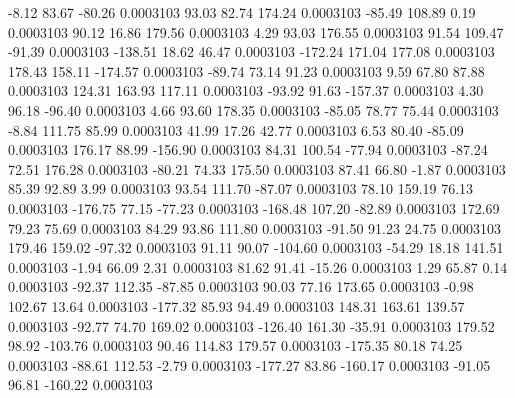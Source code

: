        -8.12       83.67      -80.26     0.0003103
       93.03       82.74      174.24     0.0003103
      -85.49      108.89        0.19     0.0003103
       90.12       16.86      179.56     0.0003103
        4.29       93.03      176.55     0.0003103
       91.54      109.47      -91.39     0.0003103
     -138.51       18.62       46.47     0.0003103
     -172.24      171.04      177.08     0.0003103
      178.43      158.11     -174.57     0.0003103
      -89.74       73.14       91.23     0.0003103
        9.59       67.80       87.88     0.0003103
      124.31      163.93      117.11     0.0003103
      -93.92       91.63     -157.37     0.0003103
        4.30       96.18      -96.40     0.0003103
        4.66       93.60      178.35     0.0003103
      -85.05       78.77       75.44     0.0003103
       -8.84      111.75       85.99     0.0003103
       41.99       17.26       42.77     0.0003103
        6.53       80.40      -85.09     0.0003103
      176.17       88.99     -156.90     0.0003103
       84.31      100.54      -77.94     0.0003103
      -87.24       72.51      176.28     0.0003103
      -80.21       74.33      175.50     0.0003103
       87.41       66.80       -1.87     0.0003103
       85.39       92.89        3.99     0.0003103
       93.54      111.70      -87.07     0.0003103
       78.10      159.19       76.13     0.0003103
     -176.75       77.15      -77.23     0.0003103
     -168.48      107.20      -82.89     0.0003103
      172.69       79.23       75.69     0.0003103
       84.29       93.86      111.80     0.0003103
      -91.50       91.23       24.75     0.0003103
      179.46      159.02      -97.32     0.0003103
       91.11       90.07     -104.60     0.0003103
      -54.29       18.18      141.51     0.0003103
       -1.94       66.09        2.31     0.0003103
       81.62       91.41      -15.26     0.0003103
        1.29       65.87        0.14     0.0003103
      -92.37      112.35      -87.85     0.0003103
       90.03       77.16      173.65     0.0003103
       -0.98      102.67       13.64     0.0003103
     -177.32       85.93       94.49     0.0003103
      148.31      163.61      139.57     0.0003103
      -92.77       74.70      169.02     0.0003103
     -126.40      161.30      -35.91     0.0003103
      179.52       98.92     -103.76     0.0003103
       90.46      114.83      179.57     0.0003103
     -175.35       80.18       74.25     0.0003103
      -88.61      112.53       -2.79     0.0003103
     -177.27       83.86     -160.17     0.0003103
      -91.05       96.81     -160.22     0.0003103
